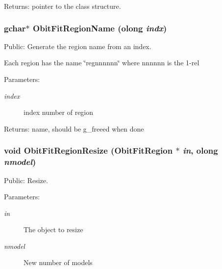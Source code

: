 \begin{Desc}
\item[Returns:]pointer to the class structure. \end{Desc}
\subsubsection{\setlength{\rightskip}{0pt plus 5cm}gchar$\ast$ Obit\-Fit\-Region\-Name ({\bf olong} {\em indx})}\label{ObitFitRegion_8h_a7}


Public: Generate the region name from an index. 

Each region has the name \char`\"{}regnnnnnn\char`\"{} where nnnnnn is the 1-rel \begin{Desc}
\item[Parameters:]
\begin{description}
\item[{\em index}]index number of region \end{description}
\end{Desc}
\begin{Desc}
\item[Returns:]name, should be g\_\-freeed when done \end{Desc}
\subsubsection{\setlength{\rightskip}{0pt plus 5cm}void Obit\-Fit\-Region\-Resize ({\bf Obit\-Fit\-Region} $\ast$ {\em in}, {\bf olong} {\em nmodel})}\label{ObitFitRegion_8h_a11}


Public: Resize. 

\begin{Desc}
\item[Parameters:]
\begin{description}
\item[{\em in}]The object to resize \item[{\em nmodel}]New number of models \end{description}
\end{Desc}
